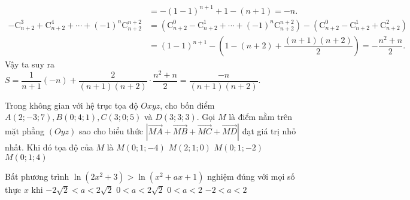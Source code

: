 \begin{ex}
{\begin{align*}
		&=-\left(1-1\right)^{n+1}+1-\left(n+1\right)=-n.\\
		-\mathrm{C}_{n+2}^3+\mathrm{C}_{n+2}^4+\cdots +\left(-1\right)^n\mathrm{C}_{n+2}^{n+2}&=\left(\mathrm{C}_{n+2}^0-\mathrm{C}_{n+2}^1+\cdots +{\left(-1\right)}^n\mathrm{C}_{n+2}^{n+2}\right)-\left(\mathrm{C}_{n+2}^0-\mathrm{C}_{n+2}^1+\mathrm{C}_{n+2}^2\right)\\
		&=\left(1-1\right)^{n+1}-\left(1-\left(n+2\right)+\dfrac{\left(n+1\right)\left(n+2\right)}{2}\right)=-\dfrac{n^2+n}{2}.
		\end{align*}
		Vậy ta suy ra
		$S=\dfrac{1}{n+1}\left(-n\right)+\dfrac{2}{\left(n+1\right)\left(n+2\right)}\cdot \dfrac{n^2+n}{2}=\dfrac{-n}{\left(n+1\right)\left(n+2\right)}$.
	}
\end{ex}
\begin{ex}%
	Trong không gian với hệ trục tọa độ $Oxyz$, cho bốn điểm $A\left(2;-3;7\right), B\left(0;4;1\right), C\left(3;0;5\right)$ và $D\left(3;3;3\right)$. Gọi $M$ là điểm nằm trên mặt phẳng $\left(Oyz\right)$ sao cho biểu thức $\left|\vec{MA}+\vec{MB}+\vec{MC}+\vec{MD}\right|$ đạt giá trị nhỏ nhất. Khi đó tọa độ của $M$ là
	\choice
	{$M\left(0;1;-4\right)$}
	{$M\left(2;1;0\right)$}
	{$M\left(0;1;-2\right)$}
	{\True $M\left(0;1;4\right)$}
\end{ex}
\begin{ex}%
	Bất phương trình $\ln \left(2x^2+3\right)>\ln \left(x^2+ax+1\right)$ nghiệm đúng với mọi số thực $x$ khi
	\choice
	{$-2\sqrt{2}<a<2\sqrt{2}$}
	{$0<a<2\sqrt{2}$}
	{$0<a<2$}
	{\True $-2<a<2$}
\end{ex}
